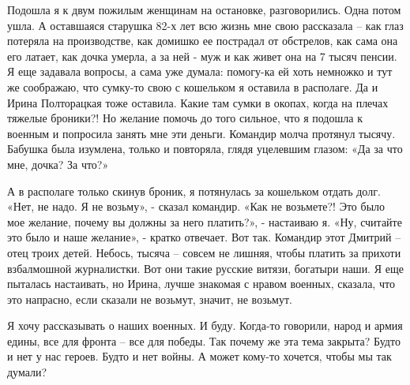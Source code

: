 Подошла я к двум пожилым женщинам на остановке, разговорились. Одна потом ушла.
А оставшаяся старушка 82-х лет всю жизнь мне свою рассказала – как глаз
потеряла на производстве, как домишко ее пострадал от обстрелов, как сама она
его латает, как дочка умерла, а за ней - муж и как живет она на 7 тысяч пенсии.
Я еще задавала вопросы, а сама уже думала: помогу-ка ей хоть немножко и тут же
соображаю, что сумку-то свою с кошельком я оставила в располаге. Да и Ирина
Полторацкая тоже оставила. Какие там сумки в окопах, когда на плечах тяжелые
броники?! Но желание помочь до того сильное, что я подошла к военным и
попросила занять мне эти деньги. Командир молча протянул тысячу. Бабушка была
изумлена, только и повторяла, глядя уцелевшим глазом: «Да за что мне, дочка? За
что?»

А в располаге только скинув броник, я потянулась за кошельком отдать долг.
«Нет, не надо. Я не возьму», - сказал командир. «Как не возьмете?! Это было мое
желание, почему вы должны за него платить?», - настаиваю я. «Ну, считайте это
было и наше желание», - кратко отвечает. Вот так. Командир этот Дмитрий – отец
троих детей. Небось, тысяча – совсем не лишняя, чтобы платить за прихоти
взбалмошной журналистки. Вот они такие русские витязи, богатыри наши. Я еще
пыталась настаивать, но Ирина, лучше знакомая с нравом военных, сказала, что
это напрасно, если сказали не возьмут, значит, не возьмут. 

Я хочу рассказывать о наших военных. И буду. Когда-то говорили, народ и армия
едины, все для фронта – все для победы. Так почему же эта тема закрыта? Будто и
нет у нас героев. Будто и нет войны. А может кому-то хочется, чтобы мы так
думали?

